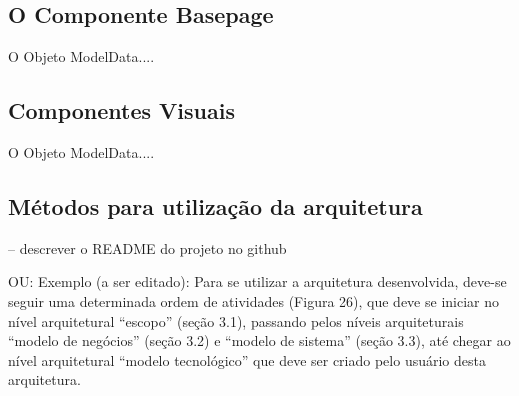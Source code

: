 \subsection{O Componente Basepage}\label{sec:solucao-desenvolvida}
O Objeto ModelData....


\subsection{Componentes Visuais}\label{sec:solucao-desenvolvida}
O Objeto ModelData....



\subsection{Métodos para utilização da arquitetura}
-- descrever o README do projeto no github

OU:
Exemplo (a ser editado): Para se utilizar a arquitetura desenvolvida, deve-se seguir uma determinada ordem de atividades (Figura 26), que deve se iniciar no nível arquitetural “escopo” (seção 3.1), passando pelos níveis arquiteturais “modelo de negócios” (seção 3.2) e “modelo de sistema” (seção 3.3), até chegar ao nível arquitetural “modelo tecnológico” que deve ser criado pelo usuário desta arquitetura.